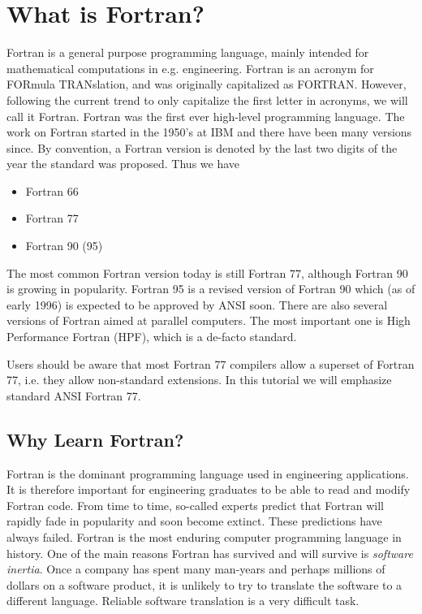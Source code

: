 \section{What is Fortran?}

Fortran is a general purpose programming language, mainly intended for
mathematical computations in e.g. engineering. Fortran is an acronym for
FORmula TRANslation, and was originally capitalized as FORTRAN. However,
following the current trend to only capitalize the first letter in
acronyms, we will call it Fortran. Fortran was the first ever high-level
programming language. The work on Fortran started in the 1950's at IBM
and there have been many versions since. By convention, a Fortran
version is denoted by the last two digits of the year the standard was
proposed. Thus we have

\begin{itemize}
    \item Fortran 66
    \item Fortran 77
    \item Fortran 90 (95)
\end{itemize}

The most common Fortran version today is still Fortran 77, although
Fortran 90 is growing in popularity. Fortran 95 is a revised version of
Fortran 90 which (as of early 1996) is expected to be approved by ANSI
soon. There are also several versions of Fortran aimed at parallel
computers. The most important one is High Performance Fortran (HPF),
which is a de-facto standard.

Users should be aware that most Fortran 77 compilers allow a superset of
Fortran 77, i.e. they allow non-standard extensions. In this tutorial we
will emphasize standard ANSI Fortran 77.


\subsection*{Why Learn Fortran?}

Fortran is the dominant programming language used in engineering
applications. It is therefore important for engineering graduates to be
able to read and modify Fortran code. From time to time, so-called
experts predict that Fortran will rapidly fade in popularity and soon
become extinct. These predictions have always failed. Fortran is the
most enduring computer programming language in history. One of the main
reasons Fortran has survived and will survive is \textit{software
inertia}. Once a company has spent many man-years and perhaps millions
of dollars on a software product, it is unlikely to try to translate the
software to a different language. Reliable software translation is a
very difficult task.


